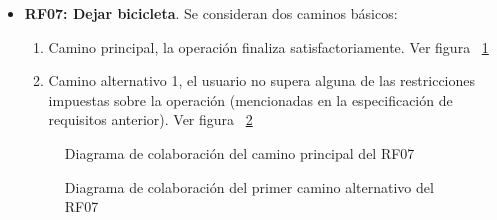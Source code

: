 \begin{itemize}
	\FloatBarrier
	\item \textbf{RF07: Dejar bicicleta}. Se consideran dos caminos básicos: 
	\begin{enumerate}
		\item Camino principal, la operación finaliza satisfactoriamente. Ver figura ~\ref{fig:diagramaColaboracion_RF07_1}
		\item Camino alternativo 1, el usuario no supera alguna de las restricciones impuestas sobre la operación (mencionadas en la especificación de requisitos anterior). Ver figura ~\ref{fig:diagramaColaboracion_RF07_2}
	\end{enumerate}
	\begin{figure} [!htb]
		\centering
		\caption{Diagrama de colaboración del camino principal del RF07}
		\label{fig:diagramaColaboracion_RF07_1}
	\end{figure}
	\begin{figure} [!htb]
		\centering
		\caption{Diagrama de colaboración del primer camino alternativo del RF07}
		\label{fig:diagramaColaboracion_RF07_2}
	\end{figure}
	

\end{itemize}

